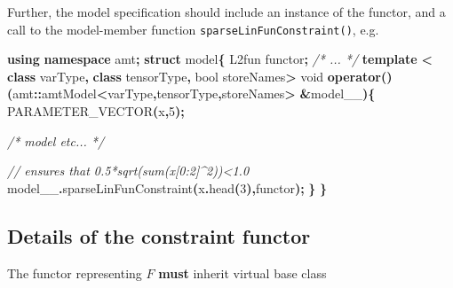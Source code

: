 \documentclass[
]{book}
\newenvironment{Shaded}{\begin{snugshade}}{\end{snugshade}}
\newcommand{\CommentTok}[1]{\textcolor[rgb]{0.56,0.35,0.01}{\textit{#1}}}
\newcommand{\DataTypeTok}[1]{\textcolor[rgb]{0.13,0.29,0.53}{#1}}
\newcommand{\DecValTok}[1]{\textcolor[rgb]{0.00,0.00,0.81}{#1}}
\newcommand{\KeywordTok}[1]{\textcolor[rgb]{0.13,0.29,0.53}{\textbf{#1}}}
\newcommand{\NormalTok}[1]{#1}
\newcommand{\OperatorTok}[1]{\textcolor[rgb]{0.81,0.36,0.00}{\textbf{#1}}}
\begin{document}
Further, the model specification should include an instance of the functor, and a
call to the model-member function \texttt{sparseLinFunConstraint()}, e.g.

\begin{Shaded}
\begin{Highlighting}[]
\KeywordTok{using} \KeywordTok{namespace}\NormalTok{ amt}\OperatorTok{;}
\KeywordTok{struct}\NormalTok{ model}\OperatorTok{\{}
\NormalTok{  L2fun functor}\OperatorTok{;}
  \CommentTok{/* ... */}
  \KeywordTok{template} \OperatorTok{\textless{}} \KeywordTok{class}\NormalTok{ varType}\OperatorTok{,} \KeywordTok{class}\NormalTok{ tensorType}\OperatorTok{,} \DataTypeTok{bool}\NormalTok{ storeNames}\OperatorTok{\textgreater{}}
  \DataTypeTok{void} \KeywordTok{operator}\OperatorTok{()(}\NormalTok{amt}\OperatorTok{::}\NormalTok{amtModel}\OperatorTok{\textless{}}\NormalTok{varType}\OperatorTok{,}\NormalTok{tensorType}\OperatorTok{,}\NormalTok{storeNames}\OperatorTok{\textgreater{}} \OperatorTok{\&}\NormalTok{model\_\_}\OperatorTok{)\{}
\NormalTok{    PARAMETER\_VECTOR}\OperatorTok{(}\NormalTok{x}\OperatorTok{,}\DecValTok{5}\OperatorTok{);}
    
    \CommentTok{/* model etc... */}
      
    \CommentTok{// ensures that 0.5*sqrt(sum(x[0:2]\^{}2))\textless{}1.0}
\NormalTok{    model\_\_}\OperatorTok{.}\NormalTok{sparseLinFunConstraint}\OperatorTok{(}\NormalTok{x}\OperatorTok{.}\NormalTok{head}\OperatorTok{(}\DecValTok{3}\OperatorTok{),}\NormalTok{functor}\OperatorTok{);} 
  \OperatorTok{\}}
\OperatorTok{\}}
\end{Highlighting}
\end{Shaded}

\hypertarget{constraint-functor-details}{%
\subsection{Details of the constraint functor}\label{constraint-functor-details}}

The functor representing \(F\) \textbf{must} inherit virtual base class
\end{document}
